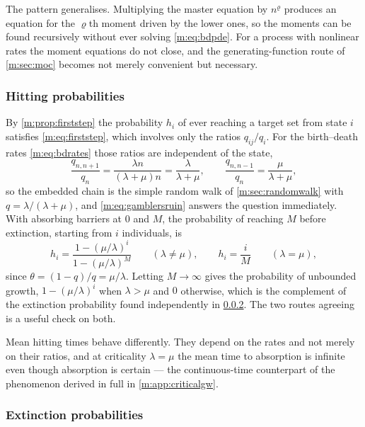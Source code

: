 The pattern generalises. Multiplying the master equation by $n^{\varrho}$ produces
an equation for the $\varrho$th moment driven by the lower ones, so the moments can
be found recursively without ever solving \cref{m:eq:bdpde}. For a process with
nonlinear rates the moment equations do not close, and the generating-function
route of \cref{m:sec:moc} becomes not merely convenient but necessary.

\subsubsection{Hitting probabilities}
\label{m:sec:hitting}

By \cref{m:prop:firststep} the probability $h_i$ of ever reaching a target set from
state $i$ satisfies \cref{m:eq:firststep}, which involves only the ratios
$q_{ij}/q_i$. For the birth--death rates \cref{m:eq:bdrates} those ratios are
independent of the state,
\begin{equation}
\label{m:eq:bdjumpratios}
\frac{q_{n,n+1}}{q_n} = \frac{\lambda n}{(\lambda+\mu)n} = \frac{\lambda}{\lambda+\mu},
\qquad
\frac{q_{n,n-1}}{q_n} = \frac{\mu}{\lambda+\mu},
\end{equation}
so the embedded chain is the simple random walk of \cref{m:sec:randomwalk} with
$q=\lambda/(\lambda+\mu)$, and \cref{m:eq:gamblersruin} answers the question
immediately. With absorbing barriers at $0$ and $M$, the probability of reaching
$M$ before extinction, starting from $i$ individuals, is
\begin{equation}
\label{m:eq:bdruin}
h_i = \frac{1-(\mu/\lambda)^i}{1-(\mu/\lambda)^M}
\qquad(\lambda\neq\mu),
\qquad
h_i = \frac{i}{M}
\qquad(\lambda=\mu),
\end{equation}
since $\theta = (1-q)/q = \mu/\lambda$. Letting $M\to\infty$ gives the probability
of unbounded growth, $1-(\mu/\lambda)^i$ when $\lambda>\mu$ and $0$ otherwise,
which is the complement of the extinction probability found independently in
\cref{m:sec:extinctionprob}. The two routes agreeing is a useful check on both.

Mean hitting times behave differently. They
depend on the rates and not merely on their ratios, and at criticality
$\lambda=\mu$ the mean time to absorption is infinite even though absorption is
certain --- the continuous-time counterpart of the phenomenon derived in full in
\cref{m:app:criticalgw}.

\subsubsection{Extinction probabilities}
\label{m:sec:extinctionprob}


